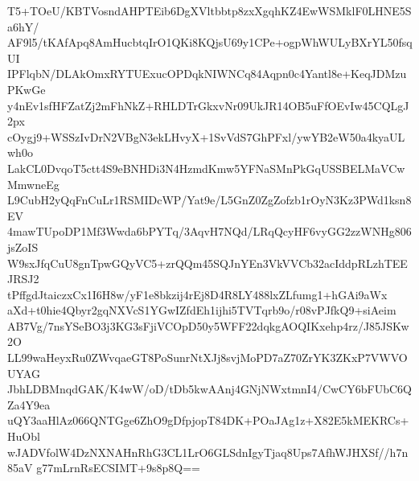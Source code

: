 T5+TOeU/KBTVosndAHPTEib6DgXVltbbtp8zxXgqhKZ4EwWSMklF0LHNE5Sa6hY/
AF9l5/tKAfApq8AmHucbtqIrO1QKi8KQjsU69y1CPe+ogpWhWULyBXrYL50fsqUI
IPFlqbN/DLAkOmxRYTUExucOPDqkNIWNCq84Aqpn0c4Yantl8e+KeqJDMzuPKwGe
y4nEv1sfHFZatZj2mFhNkZ+RHLDTrGkxvNr09UkJR14OB5uFfOEvIw45CQLgJ2px
cOygj9+WSSzIvDrN2VBgN3ekLHvyX+1SvVdS7GhPFxl/ywYB2eW50a4kyaULwh0o
LakCL0DvqoT5ctt4S9eBNHDi3N4HzmdKmw5YFNaSMnPkGqUSSBELMaVCwMmwneEg
L9CubH2yQqFnCuLr1RSMIDcWP/Yat9e/L5GnZ0ZgZofzb1rOyN3Kz3PWd1ksn8EV
4mawTUpoDP1Mf3Wwda6bPYTq/3AqvH7NQd/LRqQcyHF6vyGG2zzWNHg806jsZoIS
W9sxJfqCuU8gnTpwGQyVC5+zrQQm45SQJnYEn3VkVVCb32acIddpRLzhTEEJRSJ2
tPffgdJtaiczxCx1I6H8w/yF1e8bkzij4rEj8D4R8LY488lxZLfumg1+hGAi9aWx
aXd+t0hie4Qbyr2gqNXVcS1YGwIZfdEh1ijhi5TVTqrb9o/r08vPJfkQ9+siAeim
AB7Vg/7nsYSeBO3j3KG3sFjiVCOpD50y5WFF22dqkgAOQIKxehp4rz/J85JSKw2O
LL99waHeyxRu0ZWvqaeGT8PoSunrNtXJj8svjMoPD7aZ70ZrYK3ZKxP7VWVOUYAG
JbhLDBMnqdGAK/K4wW/oD/tDb5kwAAnj4GNjNWxtmnI4/CwCY6bFUbC6QZa4Y9ea
uQY3aaHlAz066QNTGge6ZhO9gDfpjopT84DK+POaJAg1z+X82E5kMEKRCs+HuObl
wJADVfolW4DzNXNAHnRhG3CL1LrO6GLSdnIgyTjaq8Ups7AfhWJHXSf//h7n85aV
g77mLrnRsECSIMT+9s8p8Q==
